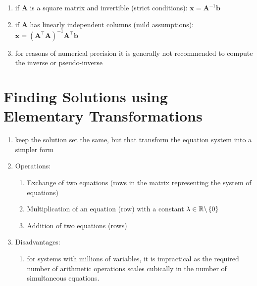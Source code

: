 \begin{enumerate}
    \item if $\bm{A}$ is a square matrix and invertible (strict conditions): $\bm{x} = \bm{A}^{-1}\bm{b}$
    \hfill \cite{mfml/book/mml/Deisenroth-Faisal-Ong}

    \item if $\bm{A}$ has linearly independent columns (mild assumptions): $\bm{x} = (\bm{A}^\top  \bm{A})^{-1}\bm{A}^\top \bm{b}$
    \hfill \cite{mfml/book/mml/Deisenroth-Faisal-Ong}

    \item for reasons of numerical precision it is generally not recommended to compute the inverse or pseudo-inverse
    \hfill \cite{mfml/book/mml/Deisenroth-Faisal-Ong}
\end{enumerate}


\section{Finding Solutions using Elementary Transformations}

\begin{enumerate}
    \item keep the solution set the same, but that transform the equation system into a simpler form
    \hfill \cite{mfml/book/mml/Deisenroth-Faisal-Ong}

    \item Operations:
    \begin{enumerate}
        \item Exchange of two equations (rows in the matrix representing the system of equations)
        \hfill \cite{mfml/book/mml/Deisenroth-Faisal-Ong}

        \item Multiplication of an equation (row) with a constant $\lambda \in \mathbb{R} \backslash \left\{0\right\}$
        \hfill \cite{mfml/book/mml/Deisenroth-Faisal-Ong}

        \item Addition of two equations (rows) 
        \hfill \cite{mfml/book/mml/Deisenroth-Faisal-Ong}
    \end{enumerate}

    \item Disadvantages:
    \begin{enumerate}
        \item for systems with millions of variables, it is impractical as the required number of arithmetic operations scales cubically in the number of simultaneous equations.
        \hfill \cite{mfml/book/mml/Deisenroth-Faisal-Ong}
    \end{enumerate}
\end{enumerate}




